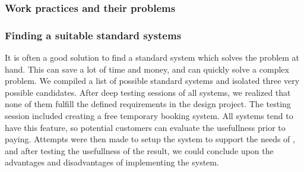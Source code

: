 \subsubsection{Work practices and their problems}

\subsubsection{Finding a suitable standard systems}
It is often a good solution to find a standard system which solves the problem 
at hand. This can save a lot of time and money, and can quickly solve a complex
problem.
We compiled a list of possible standard systems and isolated three very possible
candidates. After deep testing sessions of all systems, we realized that none
of them fulfill the defined requirements in the design project. The testing
session included creating a free temporary booking system. All systems tend to 
have this feature, so potential customers can evaluate the usefullness prior to 
paying. Attempts were then made to setup the system to support the needs of
\gomonkey{}, and after testing the usefullness of the result, we could conclude
upon the advantages and disadvantages of implementing the system.

